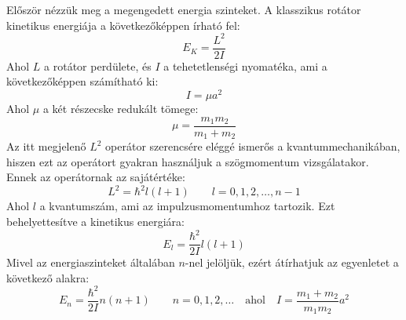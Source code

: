 \documentclass[../main.tex]{subfiles}
\begin{document}
Először nézzük meg a megengedett energia szinteket. A klasszikus rotátor kinetikus energiája a következőképpen írható fel:
\begin{equation}
    E_K = \frac{L^2}{2I}
\end{equation}
Ahol $L$ a rotátor perdülete, és $I$ a tehetetlenségi nyomatéka, ami a következőképpen számítható ki:
\begin{equation}
    I = \mu a^2
\end{equation}
Ahol $\mu$ a két részecske redukált tömege:
\begin{equation}
    \mu = \frac{m_1 m_2}{m_1 + m_2}
\end{equation}
Az itt megjelenő $L^2$ operátor szerencsére eléggé ismerős a kvantummechanikában, hiszen ezt az operátort gyakran használjuk a szögmomentum
vizsgálatakor. Ennek az operátornak az sajátértéke:
\begin{equation}
    L^2 = \hbar^2 l (l + 1) \quad \quad l = 0, 1, 2, \ldots, n-1
\end{equation}
Ahol $l$ a kvantumszám, ami az impulzusmomentumhoz tartozik. Ezt behelyettesítve a kinetikus energiára:
\begin{equation}
    E_l = \frac{\hbar^2}{2I} l (l + 1)
\end{equation}
Mivel az energiaszinteket általában $n$-nel jelöljük, ezért átírhatjuk az egyenletet a következő alakra:
\begin{equation}
    E_n = \frac{\hbar^2}{2I} n (n + 1) \quad \quad n = 0, 1, 2, \ldots \quad \text{ahol} \quad I = \frac{m_1 + m_2}{m_1 m_2} a^2
\end{equation}
\end{document}
